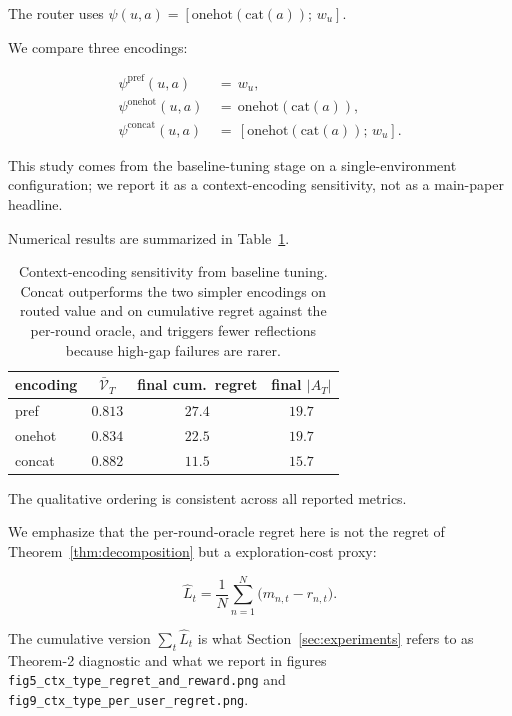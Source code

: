 \documentclass{article} %
\begin{document}
The router uses $\psi(u,a)=[\mathrm{onehot}(\mathrm{cat}(a));\,w_u]$.

We compare three encodings:

\begin{align}
\label{eq:app-ctx-pref}
\psi^{\mathrm{pref}}(u,a) &\,=\, w_u,\\
\label{eq:app-ctx-onehot}
\psi^{\mathrm{onehot}}(u,a) &\,=\, \mathrm{onehot}(\mathrm{cat}(a)),\\
\label{eq:app-ctx-concat}
\psi^{\mathrm{concat}}(u,a) &\,=\, [\mathrm{onehot}(\mathrm{cat}(a));\,w_u].
\end{align}

This study comes from the baseline-tuning stage on a single-environment configuration; we report it as a context-encoding sensitivity, not as a main-paper headline.

Numerical results are summarized in Table~\ref{tab:app-ctx-type}.

\begin{table}[h]
\centering
\small
\begin{tabular}{lccc}
\toprule
encoding & $\bar{\mathcal{V}}_T$ & final cum.\ regret & final $|A_T|$ \\
\midrule
pref     & $0.813$ & $27.4$ & $19.7$ \\
onehot   & $0.834$ & $22.5$ & $19.7$ \\
concat   & $0.882$ & $11.5$ & $15.7$ \\
\bottomrule
\end{tabular}
\caption{Context-encoding sensitivity from baseline tuning. Concat outperforms the two simpler encodings on routed value and on cumulative regret against the per-round oracle, and triggers fewer reflections because high-gap failures are rarer.}
\label{tab:app-ctx-type}
\end{table}

The qualitative ordering is consistent across all reported metrics.

We emphasize that the per-round-oracle regret here is not the regret of Theorem~\ref{thm:decomposition} but a exploration-cost proxy:

\begin{equation}
\label{eq:app-emp-LT-recap}
\hat{L}_t = \frac{1}{N}\sum_{n=1}^{N}\big(m_{n,t}-r_{n,t}\big).
\end{equation}

The cumulative version $\sum_t \hat{L}_t$ is what Section~\ref{sec:experiments} refers to as Theorem-2 diagnostic and what we report in figures \texttt{fig5\_ctx\_type\_regret\_and\_reward.png} and \texttt{fig9\_ctx\_type\_per\_user\_regret.png}.
\end{document}
